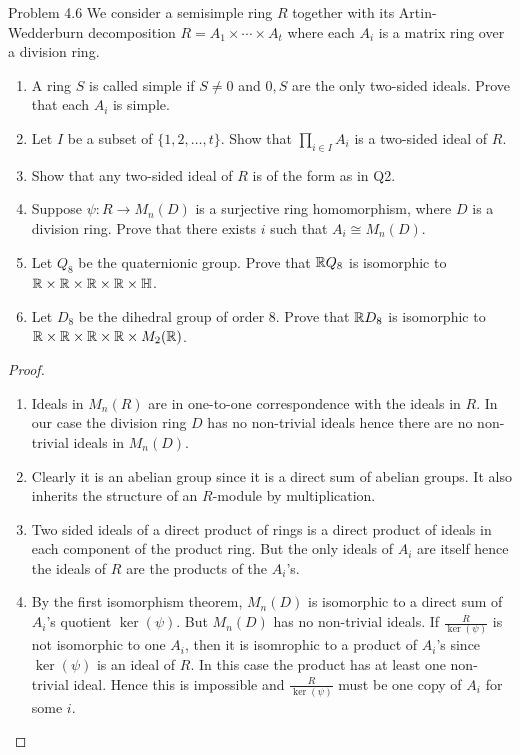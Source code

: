 \documentclass[a4paper]{article}
\begin{document}
\begin{ex}{Problem 4.6}{} We consider a semisimple ring $R$ together with its Artin-Wedderburn decomposition $R=A_1\times\cdots\times A_t$ where each $A_i$ is a matrix ring over a division ring.
\begin{enumerate}
\item A ring $S$ is called simple if $S\neq 0$ and $0,S$ are the only two-sided ideals. Prove that each $A_i$ is simple.
\item Let $I$ be a subset of $\{1,2,\dots,t\}$. Show that $\prod_{i\in I}A_i$ is a two-sided ideal of $R$.
\item Show that any two-sided ideal of $R$ is of the form as in Q2.
\item Suppose $\psi:R\to M_n(D)$ is a surjective ring homomorphism, where $D$ is a division
ring. Prove that there exists $i$ such that $A_i\cong M_n(D)$.
\item Let $Q_8$ be the quaternionic group. Prove that $\mathbb{R} Q_8$ is isomorphic to $\mathbb{R}\times\mathbb{R}\times\mathbb{R}\times\mathbb{R}\times\mathbb{H}$. 
\item Let $D_8$ be the dihedral group of order $8$. Prove that $\mathbb{R} D_8$ is isomorphic to $\mathbb{R}\times\mathbb{R}\times\mathbb{R}\times\mathbb{R}\times M_2(\mathbb{R})$. 
\end{enumerate} \tcbline
\begin{proof}~\\
\begin{enumerate}
\item Ideals in $M_n(R)$ are in one-to-one correspondence with the ideals in $R$. In our case the division ring $D$ has no non-trivial ideals hence there are no non-trivial ideals in $M_n(D)$. 
\item Clearly it is an abelian group since it is a direct sum of abelian groups. It also inherits the structure of an $R$-module by multiplication. 
\item Two sided ideals of a direct product of rings is a direct product of ideals in each component of the product ring. But the only ideals of $A_i$ are itself hence the ideals of $R$ are the products of the $A_i$'s. 
\item By the first isomorphism theorem, $M_n(D)$ is isomorphic to a direct sum of $A_i$'s quotient $\ker(\psi)$. But $M_n(D)$ has no non-trivial ideals. If $\frac{R}{\ker(\psi)}$ is not isomorphic to one $A_i$, then it is isomrophic to a product of $A_i$'s since $\ker(\psi)$ is an ideal of $R$. In this case the product has at least one non-trivial ideal. Hence this is impossible and $\frac{R}{\ker(\psi)}$ must be one copy of $A_i$ for some $i$. 

\end{enumerate}
\end{proof}
\end{ex}
\end{document}

